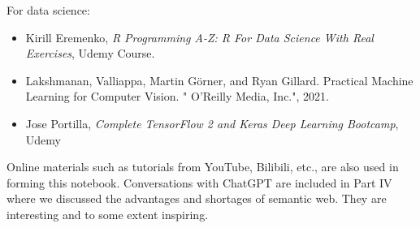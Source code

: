 For data science:
\begin{itemize}
  \item Kirill Eremenko, \textit{R Programming A-Z: R For Data Science With Real Exercises}, Udemy Course.
  \item Lakshmanan, Valliappa, Martin Görner, and Ryan Gillard. Practical Machine Learning for Computer Vision. " O'Reilly Media, Inc.", 2021.
  \item Jose Portilla, \textit{Complete TensorFlow 2 and Keras Deep Learning Bootcamp}, Udemy
\end{itemize}

Online materials such as tutorials from YouTube, Bilibili, etc., are also used in forming this notebook. Conversations with ChatGPT are included in Part IV where we discussed the advantages and shortages of semantic web. They are interesting and to some extent inspiring. 